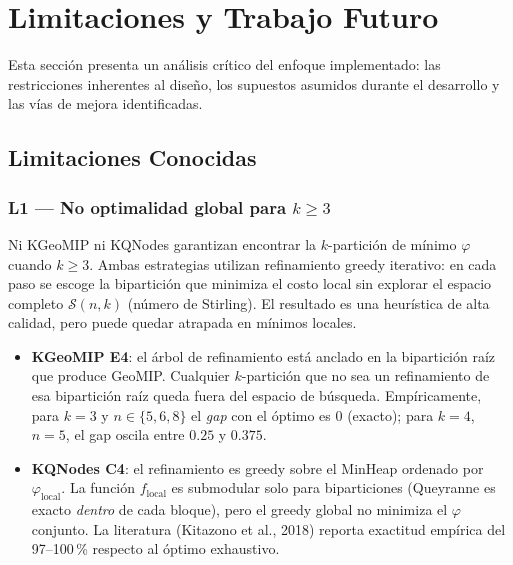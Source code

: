 
\section{Limitaciones y Trabajo Futuro}

Esta sección presenta un análisis crítico del enfoque implementado: las
restricciones inherentes al diseño, los supuestos asumidos durante el
desarrollo y las vías de mejora identificadas.

\subsection{Limitaciones Conocidas}

\subsubsection*{L1 — No optimalidad global para $k \geq 3$}

Ni KGeoMIP ni KQNodes garantizan encontrar la $k$-partición de mínimo
$\varphi$ cuando $k \geq 3$.
Ambas estrategias utilizan refinamiento greedy iterativo: en cada paso se
escoge la bipartición que minimiza el costo local sin explorar el espacio
completo $\mathcal{S}(n,k)$ (número de Stirling).
El resultado es una heurística de alta calidad, pero puede quedar atrapada
en mínimos locales.

\begin{itemize}
  \item \textbf{KGeoMIP E4}: el árbol de refinamiento está anclado en la
        bipartición raíz que produce GeoMIP. Cualquier $k$-partición que
        no sea un refinamiento de esa bipartición raíz queda fuera del
        espacio de búsqueda.
        Empíricamente, para $k=3$ y $n \in \{5,6,8\}$ el \textit{gap}
        con el óptimo es $0$ (exacto); para $k=4$, $n=5$, el gap oscila
        entre $0.25$ y $0.375$.

  \item \textbf{KQNodes C4}: el refinamiento es greedy sobre el MinHeap
        ordenado por $\varphi_{\text{local}}$. La función $f_{\text{local}}$
        es submodular solo para biparticiones (Queyranne es exacto
        \emph{dentro} de cada bloque), pero el greedy global no minimiza
        el $\varphi$ conjunto.
        La literatura (Kitazono et al., 2018) reporta exactitud empírica
        del 97--100\,\% respecto al óptimo exhaustivo.
\end{itemize}

